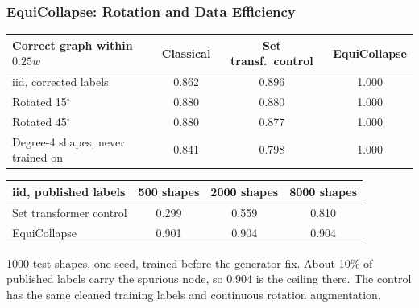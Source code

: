 \begin{frame}[fragile]\frametitle{EquiCollapse: Rotation and Data Efficiency}
\begin{center}
\small
\begin{tabular}{@{}lccc@{}}
\toprule
\textbf{Correct graph within $0.25w$} & \textbf{Classical} & \textbf{Set transf.\ control} & \textbf{EquiCollapse} \\
\midrule
iid, corrected labels & 0.862 & 0.896 & 1.000 \\
Rotated 15$^\circ$ & 0.880 & 0.880 & 1.000 \\
Rotated 45$^\circ$ & 0.880 & 0.877 & 1.000 \\
Degree-4 shapes, never trained on & 0.841 & 0.798 & 1.000 \\
\bottomrule
\end{tabular}
\end{center}

\vspace{4pt}
\begin{center}
\small
\begin{tabular}{@{}lccc@{}}
\toprule
\textbf{iid, published labels} & 500 shapes & 2000 shapes & 8000 shapes \\
\midrule
Set transformer control & 0.299 & 0.559 & 0.810 \\
EquiCollapse & 0.901 & 0.904 & 0.904 \\
\bottomrule
\end{tabular}
\end{center}

{\footnotesize 1000 test shapes, one seed, trained before the generator fix. About 10\% of published labels carry the spurious node, so 0.904 is the ceiling there. The control has the same cleaned training labels and continuous rotation augmentation.}
\end{frame}

